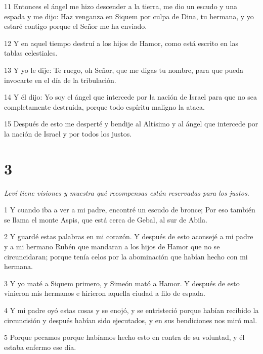 \par 11 Entonces el ángel me hizo descender a la tierra, me dio un escudo y una espada y me dijo: Haz venganza en Siquem por culpa de Dina, tu hermana, y yo estaré contigo porque el Señor me ha enviado.

\par 12 Y en aquel tiempo destruí a los hijos de Hamor, como está escrito en las tablas celestiales.

\par 13 Y yo le dije: Te ruego, oh Señor, que me digas tu nombre, para que pueda invocarte en el día de la tribulación.

\par 14 Y él dijo: Yo soy el ángel que intercede por la nación de Israel para que no sea completamente destruida, porque todo espíritu maligno la ataca.

\par 15 Después de esto me desperté y bendije al Altísimo y al ángel que intercede por la nación de Israel y por todos los justos.

\chapter{3}

\par \textit{Leví tiene visiones y muestra qué recompensas están reservadas para los justos.}

\par 1 Y cuando iba a ver a mi padre, encontré un escudo de bronce; Por eso también se llama el monte Aspis, que está cerca de Gebal, al sur de Abila.

\par 2 Y guardé estas palabras en mi corazón. Y después de esto aconsejé a mi padre y a mi hermano Rubén que mandaran a los hijos de Hamor que no se circuncidaran; porque tenía celos por la abominación que habían hecho con mi hermana.

\par 3 Y yo maté a Siquem primero, y Simeón mató a Hamor. Y después de esto vinieron mis hermanos e hirieron aquella ciudad a filo de espada.

\par 4 Y mi padre oyó estas cosas y se enojó, y se entristeció porque habían recibido la circuncisión y después habían sido ejecutados, y en sus bendiciones nos miró mal.

\par 5 Porque pecamos porque habíamos hecho esto en contra de su voluntad, y él estaba enfermo ese día.

